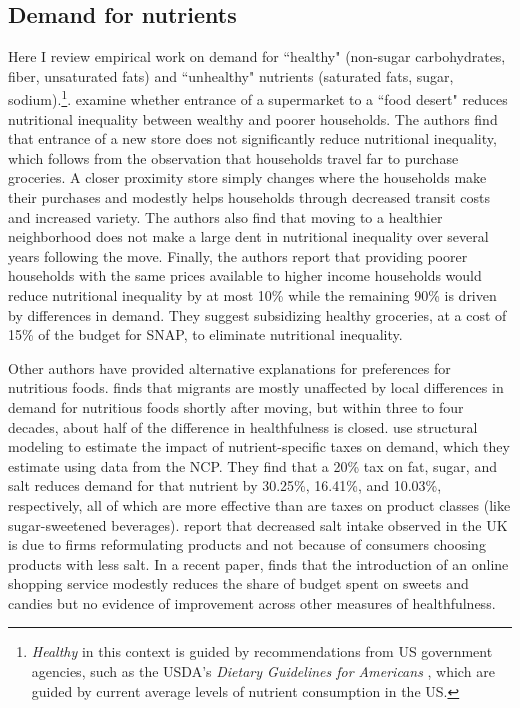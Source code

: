 \documentclass[12pt]{article}
\begin{document}
\subsection{Demand for nutrients}

Here I review empirical work on demand for ``healthy" (non-sugar carbohydrates, fiber, unsaturated fats) and ``unhealthy" nutrients (saturated fats, sugar, sodium).\footnote{\textit{Healthy} in this context is guided by recommendations from US government agencies, such as the USDA's \textit{Dietary Guidelines for Americans} \citeyear{usda2021}, which are guided by current average levels of nutrient consumption in the US.}.
\textcite{allcott2019food} examine whether entrance of a supermarket to a ``food desert" reduces nutritional inequality between wealthy and poorer households.
The authors find that entrance of a new store does not significantly reduce nutritional inequality, which follows from the observation that households travel far to purchase groceries.
A closer proximity store simply changes where the households make their purchases and modestly helps households through decreased transit costs and increased variety.
The authors also find that moving to a healthier neighborhood does not make a large dent in nutritional inequality over several years following the move.
Finally, the authors report that providing poorer households with the same prices available to higher income households would reduce nutritional inequality by at most 10\% while the remaining 90\% is driven by differences in demand.
They suggest subsidizing healthy groceries, at a cost of 15\% of the budget for SNAP, to eliminate nutritional inequality.

Other authors have provided alternative explanations for preferences for nutritious foods.
\textcite{hut2020determinants} finds that migrants are mostly unaffected by local differences in demand for nutritious foods shortly after moving, but within three to four decades, about half of the difference in healthfulness is closed.
\textcite{harding2017effect} use structural modeling to estimate the impact of nutrient-specific taxes on demand, which they estimate using data from the NCP.
They find that a 20\% tax on fat, sugar, and salt reduces demand for that nutrient by 30.25\%, 16.41\%, and 10.03\%, respectively, all of which are more effective than are taxes on product classes (like sugar-sweetened beverages).
\textcite{griffith2017importance} report that decreased salt intake observed in the UK is due to firms reformulating products and not because of consumers choosing products with less salt.
In a recent paper, \textcite{harris2020online} finds that the introduction of an online shopping service modestly reduces the share of budget spent on sweets and candies but no evidence of improvement across other measures of healthfulness.
\end{document}
